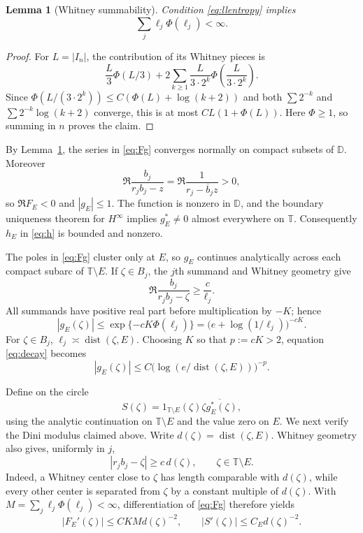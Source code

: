 \documentclass[11pt]{article}
\newtheorem{lemma}[theorem]{Lemma}
\newcommand{\T}{\mathbb T}
\newcommand{\D}{\mathbb D}
\newcommand{\dist}{\operatorname{dist}}
\begin{document}
\begin{lemma}[Whitney summability]\label{lem:sum}
Condition \eqref{eq:llentropy} implies
\[
 \sum_j\ell_j\Phi(\ell_j)<\infty.
\]
\end{lemma}
\begin{proof}
For $L=|I_n|$, the contribution of its Whitney pieces is
\[
 \frac L3\Phi(L/3)+
 2\sum_{k\geq1}\frac{L}{3\cdot2^k}
 \Phi\!\left(\frac{L}{3\cdot2^k}\right).
\]
Since $\Phi(L/(3\cdot2^k))\leq C(\Phi(L)+\log(k+2))$ and both
$\sum2^{-k}$ and $\sum2^{-k}\log(k+2)$ converge, this is at most
$CL(1+\Phi(L))$.  Here $\Phi\geq1$, so summing in $n$ proves the claim.
\end{proof}

By Lemma~\ref{lem:sum}, the series in \eqref{eq:Fg} converges normally on
compact subsets of $\D$.  Moreover
\[
 \Re\frac{b_j}{r_jb_j-z}
 =\Re\frac1{r_j-\overline b_jz}>0,
\]
so $\Re F_E<0$ and $|g_E|\leq1$.  The function is nonzero in $\D$, and
the boundary uniqueness theorem for $H^\infty$ implies
$g_E^*\neq0$ almost everywhere on $\T$.  Consequently $h_E$ in
\eqref{eq:h} is bounded and nonzero.

The poles in \eqref{eq:Fg} cluster only at $E$, so $g_E$ continues
analytically across each compact subarc of $\T\setminus E$.  If
$\zeta\in B_j$, the $j$th summand and Whitney geometry give
\[
 \Re\frac{b_j}{r_jb_j-\zeta}\geq\frac{c}{\ell_j}.
\]
All summands have positive real part before multiplication by $-K$; hence
\begin{equation}\label{eq:decay}
 |g_E(\zeta)|\leq
 \exp\{-cK\Phi(\ell_j)\}
 =\bigl(e+\log(1/\ell_j)\bigr)^{-cK}.
\end{equation}
For $\zeta\in B_j$, $\ell_j\asymp\dist(\zeta,E)$.  Choosing $K$ so that
$p:=cK>2$, equation \eqref{eq:decay} becomes
\begin{equation}\label{eq:logdecay}
 |g_E(\zeta)|\leq
 C\bigl(\log(e/\dist(\zeta,E))\bigr)^{-p}.
\end{equation}

Define on the circle
\[
 S(\zeta)=1_{\T\setminus E}(\zeta)
 \overline{\zeta g_E^*(\zeta)},
\]
using the analytic continuation on $\T\setminus E$ and the value zero on
$E$.  We next verify the Dini modulus claimed above.  Write
$d(\zeta)=\dist(\zeta,E)$.  Whitney geometry also gives, uniformly in
$j$,
\[
 |r_jb_j-\zeta|\geq c\,d(\zeta),\qquad \zeta\in\T\setminus E.
\]
Indeed, a Whitney center close to $\zeta$ has length comparable with
$d(\zeta)$, while every other center is separated from $\zeta$ by a
constant multiple of $d(\zeta)$.  With
$M=\sum_j\ell_j\Phi(\ell_j)<\infty$, differentiation of
\eqref{eq:Fg} therefore yields
\begin{equation}\label{eq:deriv}
 |F_E'(\zeta)|\leq CKM d(\zeta)^{-2},
 \qquad |S'(\zeta)|\leq C_Ed(\zeta)^{-2}.
\end{equation}
\end{document}
